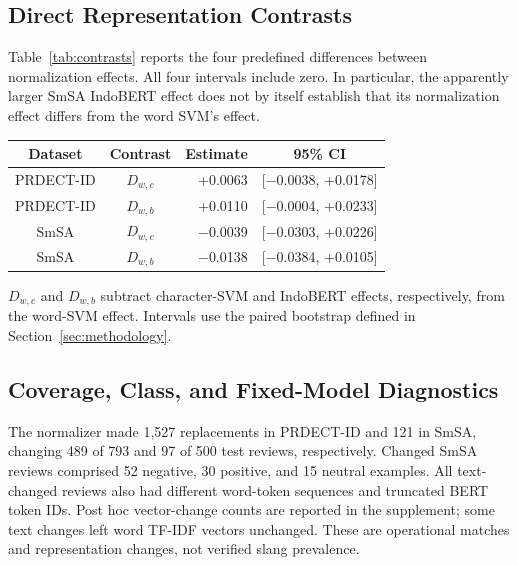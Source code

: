 \subsection{Direct Representation Contrasts}
Table~\ref{tab:contrasts} reports the four predefined differences between normalization effects. All four intervals include zero. In particular, the apparently larger SmSA IndoBERT effect does not by itself establish that its normalization effect differs from the word SVM's effect.

\par\medskip\noindent
\begin{minipage}{\columnwidth}
\makeatletter{}\makeatother
\caption{Direct Contrasts Between Normalization Effects}
\label{tab:contrasts}
\centering\small
\renewcommand{\arraystretch}{1.18}
\setlength{\tabcolsep}{3pt}
\begin{tabular}{|c|c|r|c|}
\hline
\textbf{Dataset} & \textbf{Contrast} & \textbf{Estimate} & \textbf{95\% CI} \\
\hline
PRDECT-ID & $D_{w,c}$ & +0.0063 & [$-$0.0038, +0.0178] \\
\hline
PRDECT-ID & $D_{w,b}$ & +0.0110 & [$-$0.0004, +0.0233] \\
\hline
SmSA & $D_{w,c}$ & $-$0.0039 & [$-$0.0303, +0.0226] \\
\hline
SmSA & $D_{w,b}$ & $-$0.0138 & [$-$0.0384, +0.0105] \\
\hline
\end{tabular}
\par\vspace{3pt}\raggedright\small $D_{w,c}$ and $D_{w,b}$ subtract character-SVM and IndoBERT effects, respectively, from the word-SVM effect. Intervals use the paired bootstrap defined in Section~\ref{sec:methodology}.
\end{minipage}
\par\medskip

\subsection{Coverage, Class, and Fixed-Model Diagnostics}
The normalizer made 1,527 replacements in PRDECT-ID and 121 in SmSA, changing 489 of 793 and 97 of 500 test reviews, respectively. Changed SmSA reviews comprised 52 negative, 30 positive, and 15 neutral examples. All text-changed reviews also had different word-token sequences and truncated BERT token IDs. Post hoc vector-change counts are reported in the supplement; some text changes left word TF-IDF vectors unchanged. These are operational matches and representation changes, not verified slang prevalence.

